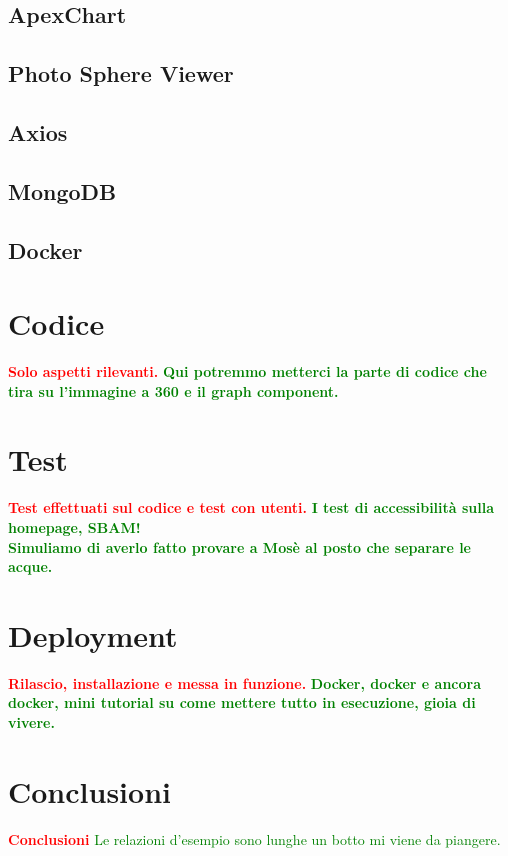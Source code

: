 \documentclass{report}
\begin{document}
\subsection{ApexChart}
\subsection{Photo Sphere Viewer}
\subsection{Axios}
\subsection{MongoDB}
\subsection{Docker}

\section{Codice}
\textcolor{red}{\textbf{Solo aspetti rilevanti.}}
\textcolor{green}{\textbf{Qui potremmo metterci la parte di codice che tira su l'immagine a 360 e il graph component.}}

\section{Test}
\textcolor{red}{\textbf{Test effettuati sul codice e test con utenti.}}
\textcolor{green}{\textbf{I test di accessibilità sulla homepage, SBAM!\\Simuliamo di averlo fatto provare a Mosè al posto che separare le acque.}}

\section{Deployment}
\textcolor{red}{\textbf{Rilascio, installazione e messa in funzione.}}
\textcolor{green}{\textbf{Docker, docker e ancora docker, mini tutorial su come mettere tutto in esecuzione, gioia di vivere.}}

\section{Conclusioni}
\textcolor{red}{\textbf{Conclusioni}}
\textcolor{green}{Le relazioni d'esempio sono lunghe un botto mi viene da piangere.}



\end{document}
